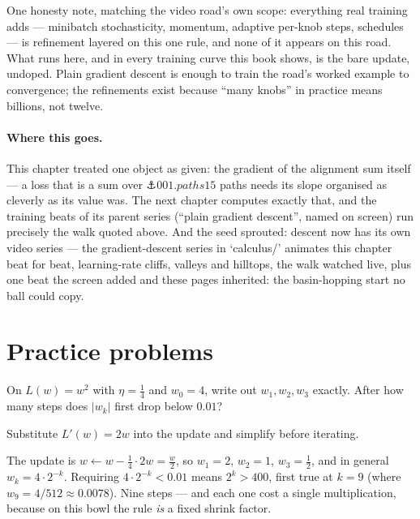 \begin{narrative}
One honesty note, matching the video road's own scope: everything
real training adds — minibatch stochasticity, momentum, adaptive
per-knob steps, schedules — is refinement layered on this
one rule, and none of it appears on this road. What runs here, and
in every training curve this book shows, is the bare update, undoped.
Plain gradient descent is enough to train the road's worked example
to convergence; the refinements exist because ``many knobs'' in
practice means billions, not twelve.

\paragraph{Where this goes.} This chapter treated one object as given:
the gradient of the alignment sum itself — a loss that is a sum over
$\anchor{001.paths15}$ paths needs its slope organised as cleverly as
its value was. The next chapter computes exactly that, and the
training beats of its parent series (``plain gradient descent'',
named on screen) run precisely the walk quoted above. And the seed
sprouted: descent now has its own video series — the gradient-descent
series in `calculus/' animates this chapter beat for beat,
learning-rate cliffs, valleys and hilltops, the walk watched live,
plus one beat the screen added and these pages inherited: the
basin-hopping start no ball could copy.
\end{narrative}

\section*{Practice problems}

\begin{problem}
On $L(w) = w^2$ with $\eta = \tfrac14$ and $w_0 = 4$, write out
$w_1, w_2, w_3$ exactly. After how many steps does $|w_k|$ first drop
below $0.01$?
\begin{hint}
Substitute $L'(w) = 2w$ into the update and simplify before
iterating.
\end{hint}
\begin{solution}
The update is $w \leftarrow w - \tfrac14 \cdot 2w = \tfrac{w}{2}$, so
$w_1 = 2$, $w_2 = 1$, $w_3 = \tfrac12$, and in general
$w_k = 4 \cdot 2^{-k}$. Requiring $4 \cdot 2^{-k} < 0.01$ means
$2^k > 400$, first true at $k = 9$ (where $w_9 = 4/512 \approx
0.0078$). Nine steps — and each one cost a single multiplication,
because on this bowl the rule \emph{is} a fixed shrink factor.
\end{solution}
\end{problem}

